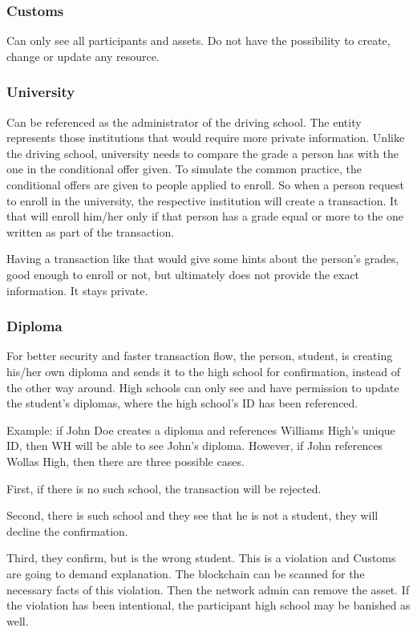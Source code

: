 \documentclass[a4paper,11pt]{report}
\begin{document}
\subsubsection{Customs}
Can only see all participants and assets. Do not have the possibility to create, change or update any resource.  

\subsubsection{University}
Can be referenced as the administrator of the driving school. The entity represents those institutions that would require more private information. Unlike the driving school, university needs to compare the grade a person has with the one in the conditional offer given. To simulate the common practice, the conditional offers are given to people applied to enroll. So when a person request to enroll in the university, the respective institution will create a transaction. It that will enroll him/her only if that person has a grade equal or more to the one written as part of the transaction. 
	
	Having a transaction like that would give some hints about the person’s grades, good enough to enroll or not, but ultimately does not provide the exact information. It stays private. 

\subsubsection{Diploma}
	For better security and faster transaction flow, the person, student, is creating his/her own diploma and sends it to the high school for confirmation, instead of the other way around. High schools can only see and have permission to update the student’s diplomas, where the high school’s ID has been referenced.
	
	Example: if John Doe creates a diploma and references Williams High's unique ID, then WH will be able to see John's diploma. However, if John references Wollas High, then there are three possible cases. 
	
	First, if there is no such school, the transaction will be rejected. 

	Second, there is such school and they see that he is not a student, they will decline the confirmation.

	Third, they confirm, but is the wrong student. This is a violation and Customs are going to demand explanation. The blockchain can be scanned for the necessary facts of this violation. Then the network admin can remove the asset. If the violation has been intentional, the participant high school may be banished as well.
\end{document}
